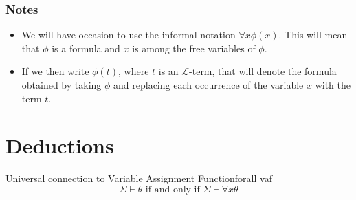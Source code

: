 \subsubsection*{Notes}
\begin{itemize}
    \item We will have occasion to use the informal notation $\forall x \phi(x)$. This will mean that $\phi$ is a formula and $x$ is among the free variables of $\phi$. 
    \item If we then write $\phi(t)$, where $t$ is an $\mathcal{L}$-term, that will denote the formula obtained by taking $\phi$ and replacing each occurrence of the variable $x$ with the term $t$. 
\end{itemize}


\section{Deductions}




\begin{lemma}{Universal connection to Variable Assignment Function}{forall vaf}
    \[
    \Sigma \vdash \theta \text { if and only if } \Sigma \vdash \forall x \theta
    \]
\end{lemma}


